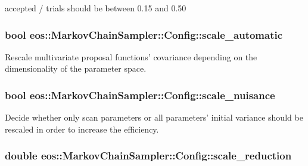 accepted / trials should be between 0.15 and 0.50 \hypertarget{classeos_1_1MarkovChainSampler_1_1Config_a2a7cc53b4fff19248ccfcd187a6a394b}{
\subsubsection[{scale\_\-automatic}]{\setlength{\rightskip}{0pt plus 5cm}bool {\bf eos::MarkovChainSampler::Config::scale\_\-automatic}}}
\label{classeos_1_1MarkovChainSampler_1_1Config_a2a7cc53b4fff19248ccfcd187a6a394b}
Rescale multivariate proposal functions' covariance depending on the dimensionality of the parameter space. \hypertarget{classeos_1_1MarkovChainSampler_1_1Config_a8bf9b803f9b7995d7b6938347fa98165}{
\subsubsection[{scale\_\-nuisance}]{\setlength{\rightskip}{0pt plus 5cm}bool {\bf eos::MarkovChainSampler::Config::scale\_\-nuisance}}}
\label{classeos_1_1MarkovChainSampler_1_1Config_a8bf9b803f9b7995d7b6938347fa98165}
Decide whether only scan parameters or all parameters' initial variance should be rescaled in order to increase the efficiency. \hypertarget{classeos_1_1MarkovChainSampler_1_1Config_aeaae399fa3b0a182dfd582f79529f7a5}{
\subsubsection[{scale\_\-reduction}]{\setlength{\rightskip}{0pt plus 5cm}double {\bf eos::MarkovChainSampler::Config::scale\_\-reduction}}}
\label{classeos_1_1MarkovChainSampler_1_1Config_aeaae399fa3b0a182dfd582f79529f7a5}


